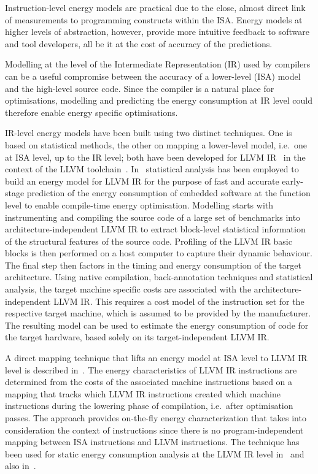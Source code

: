Instruction-level energy models are practical due to the close, almost direct
link of measurements to programming constructs within the ISA. Energy models at
higher levels of abstraction, however, provide more intuitive feedback to
software and tool developers, all be it at the cost of accuracy of the
predictions.

Modelling at the level of the Intermediate Representation (IR) used by
compilers can be a useful compromise between the accuracy of a lower-level
(ISA) model and the high-level source code. Since the compiler is a natural
place for optimisations, modelling and predicting the energy consumption at IR
level could therefore enable energy specific optimisations.

IR-level energy models have been built using two distinct techniques. One
is based on statistical methods, the other on mapping a lower-level model,
i.e.\ one at ISA level, up to the IR level; both have been developed for LLVM
IR~\cite{LattnerLLVM2004} in the context of the LLVM toolchain~\cite{LLVM}.
%
In~\cite{Brandolese2011} statistical analysis has been employed to build an
energy model for LLVM IR for the purpose of fast and accurate early-stage
prediction of the energy consumption of embedded software at the function level
to enable compile-time energy optimisation.
%
Modelling starts with instrumenting and compiling the source code of a large
set of benchmarks into architecture-independent LLVM IR to extract block-level
statistical information of the structural features of the source code.
Profiling of the LLVM IR basic blocks is then performed on a host computer to
capture their dynamic behaviour. The final step then factors in the timing and
energy consumption of the target architecture. Using native compilation,
back-annotation techniques and statistical analysis, the target machine
specific costs are associated with the architecture-independent LLVM IR. This
requires a cost model of the instruction set for the respective target machine,
which is assumed to be provided by the manufacturer. The resulting model can be
used to estimate the energy consumption of code for the target hardware, based
solely on its target-independent LLVM IR.

A direct mapping technique that lifts an energy model at ISA level to LLVM IR
level is described in~\cite{Georgiou15}. The energy characteristics of LLVM IR
instructions are determined from the costs of the associated machine
instructions based on a mapping that tracks which LLVM IR instructions created
which machine instructions during the lowering phase of compilation, i.e.\
after optimisation passes.
%
The approach provides on-the-fly energy characterization that takes into
consideration the context of instructions since there is no program-independent
mapping between ISA instructions and LLVM instructions.
%
The technique has been used for static energy consumption analysis at the LLVM IR
level in~\cite{isa-vs-llvm-fopara} and also in~\cite{grech15}. 

